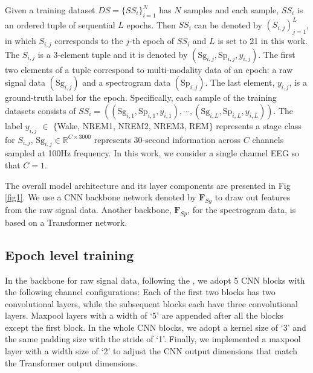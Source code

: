 Given a training dataset $DS = \{SS_i\}_{i=1}^{N}$ has $N$ samples and each sample, $SS_i$ is an ordered tuple of sequential $L$ epochs.
Then $SS_i$ can be denoted by $(S_{i, j})_{j=1}^{L}$, in which $S_{i,j}$ corresponds to the $j$-th epoch of $SS_i$ and $L$ is set to 21 in this work.
%
The $S_{i,j}$ is a 3-element tuple and it is denoted by $(\text{Sg}_{i,j}, \text{Sp}_{i,j}, {y}_{i,j})$.
%
The first two elements of a tuple correspond to multi-modality data of an epoch: a raw signal data $(\text{Sg}_{i,j})$ and a spectrogram data $(\text{Sp}_{i,j})$. The last element, ${y}_{i,j}$, is a ground-truth label for the epoch.
%
Specifically, each sample of the training datasets consists of
%
$SS_i = ((\text{Sg}_{i,1}, {\text{Sp}_{i,1}}, {y}_{i,1}), \cdots, (\text{Sg}_{i,L}, {\text{Sp}_{i,L}}, {y}_{i,L})). $
%
The label ${y}_{i,j}$ $\in$ $\{$Wake, NREM1, NREM2, NREM3, REM$\}$ represents a stage class for $S_{i,j}$, $\text{Sg}_{i,j} \in \mathbb{R}^{C \times 3000}$ represents 30-second information across $C$ channels sampled at 100Hz frequency. 
In this work, we consider a single channel EEG so that $C=1$.

The overall model architecture and its layer components are presented in Fig \ref{fig1}. We use a CNN backbone network denoted by $\textbf{F}_{Sg}$ to draw out features from the raw signal data. Another backbone, $\textbf{F}_{Sp}$, for the spectrogram data, is based on a Transformer network.




\subsection{Epoch level training}\label{3-1_epoch_level_training} %

In the backbone for raw signal data, following the \cite{perslev2019utime,SEO2020102037,lee2024sleepyco}, we adopt 5 CNN blocks with the following channel configurations: Each of the first two blocks has two convolutional layers, while the subsequent blocks each have three convolutional layers. Maxpool layers with a width of `5' are appended after all the blocks except the first block.
%
In the whole CNN blocks, we adopt a kernel size of `3' and the same padding size with the stride of `1'. 
%
Finally, we implemented a maxpool layer with a width size of `2' to adjust the CNN output dimensions that match the Transformer output dimensions.
%

